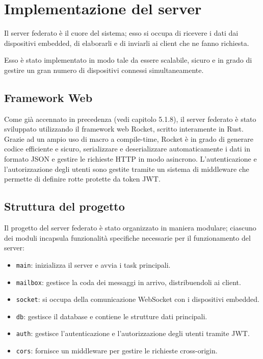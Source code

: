 \chapter{Implementazione del server}

Il server federato è il cuore del sistema; esso si occupa di ricevere i dati dai dispositivi embedded, di elaborarli e di inviarli ai client che ne fanno richiesta.

Esso è stato implementato in modo tale da essere scalabile, sicuro e in grado di gestire un gran numero di dispositivi connessi simultaneamente.

\section{Framework Web}

Come già accennato in precedenza (vedi capitolo 5.1.8), il server federato è stato sviluppato utilizzando il framework web Rocket, scritto interamente in Rust.
Grazie ad un ampio uso di macro a compile-time, Rocket è in grado di generare codice efficiente e sicuro,
serializzare e deserializzare automaticamente i dati in formato JSON e gestire le richieste HTTP in modo asincrono.
L'autenticazione e l'autorizzazione degli utenti sono gestite tramite un sistema di middleware che permette di definire rotte protette da token JWT.

\section{Struttura del progetto}

Il progetto del server federato è stato organizzato in maniera modulare; ciascuno 
dei moduli incapsula funzionalità specifiche necessarie per il funzionamento del server:

\begin{itemize}
    \item \texttt{main}: inizializza il server e avvia i task principali.
    \item \texttt{mailbox}: gestisce la coda dei messaggi in arrivo, distribuendoli ai client.
    \item \texttt{socket}: si occupa della comunicazione WebSocket con i dispositivi embedded.
    \item \texttt{db}: gestisce il database e contiene le strutture dati principali.
    \item \texttt{auth}: gestisce l'autenticazione e l'autorizzazione degli utenti tramite JWT.
    \item \texttt{cors}: fornisce un middleware per gestire le richieste cross-origin.
\end{itemize}

